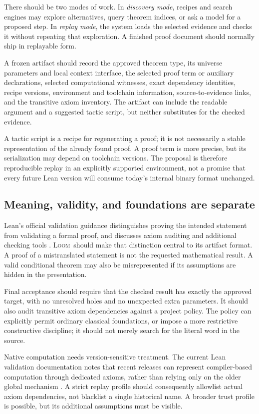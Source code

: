 \documentclass[11pt,letterpaper]{article}
\newcommand{\Loom}{\textsc{Loom}}
\newcommand{\code}[1]{\texttt{\detokenize{#1}}}
\theoremstyle{remark}
\begin{document}
There should be two modes of work. In \emph{discovery mode}, recipes and search engines may explore alternatives, query theorem indices, or ask a model for a proposed step. In \emph{replay mode}, the system loads the selected evidence and checks it without repeating that exploration. A finished proof document should normally ship in replayable form.

A frozen artifact should record the approved theorem type, its universe parameters and local context interface, the selected proof term or auxiliary declarations, selected computational witnesses, exact dependency identities, recipe versions, environment and toolchain information, source-to-evidence links, and the transitive axiom inventory. The artifact can include the readable argument and a suggested tactic script, but neither substitutes for the checked evidence.

A tactic script is a recipe for regenerating a proof; it is not necessarily a stable representation of the already found proof. A proof term is more precise, but its serialization may depend on toolchain versions. The proposal is therefore reproducible replay in an explicitly supported environment, not a promise that every future Lean version will consume today's internal binary format unchanged.

\subsection{Meaning, validity, and foundations are separate}

Lean's official validation guidance distinguishes proving the intended statement from validating a formal proof, and discusses axiom auditing and additional checking tools \cite{lean-validation}. \Loom\ should make that distinction central to its artifact format. A proof of a mistranslated statement is not the requested mathematical result. A valid conditional theorem may also be misrepresented if its assumptions are hidden in the presentation.

Final acceptance should require that the checked result has exactly the approved target, with no unresolved holes and no unexpected extra parameters. It should also audit transitive axiom dependencies against a project policy. The policy can explicitly permit ordinary classical foundations, or impose a more restrictive constructive discipline; it should not merely search for the literal word \code{sorry} in the source.

Native computation needs version-sensitive treatment. The current Lean validation documentation notes that recent releases can represent compiler-based computation through dedicated axioms, rather than relying only on the older global mechanism \cite{lean-validation}. A strict replay profile should consequently allowlist actual axiom dependencies, not blacklist a single historical name. A broader trust profile is possible, but its additional assumptions must be visible.
\end{document}
